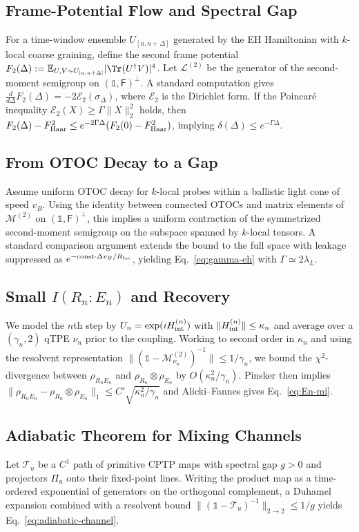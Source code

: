 \documentclass[aps,prd,preprint,onecolumn,superscriptaddress,nofootinbib,longbibliography,floatfix,11pt,showpacs,showkeys]{revtex4-2}
\theoremstyle{plain}
\theoremstyle{definition}
\theoremstyle{remark}
\begin{document}
\subsection{Frame-Potential Flow and Spectral Gap}
For a time-window ensemble $U_{[u,u+\Delta]}$ generated by the EH Hamiltonian with $k$-local coarse graining, define the second frame potential $F_2(\Delta) := \mathbb{E}_{U,V \sim U_{[u,u+\Delta]}} |\Tr(U^\dagger V)|^4$. Let $\mathcal{L}^{(2)}$ be the generator of the second-moment semigroup on $(\mathbb{1}, \mathsf{F})^\perp$. A standard computation gives $\frac{d}{d\Delta} F_2(\Delta) = -2 \mathcal{E}_2(\sigma_\Delta)$, where $\mathcal{E}_2$ is the Dirichlet form. If the Poincaré inequality $\mathcal{E}_2(X) \ge \Gamma \|X\|_2^2$ holds, then $F_2(\Delta) - F_{\rm Haar}^2 \le e^{-2\Gamma\Delta} (F_2(0) - F_{\rm Haar}^2)$, implying $\delta(\Delta) \le e^{-\Gamma\Delta}$.

\subsection{From OTOC Decay to a Gap}
Assume uniform OTOC decay for $k$-local probes within a ballistic light cone of speed $v_B$. Using the identity between connected OTOCs and matrix elements of $\mathcal{M}^{(2)}$ on $(\mathbb{1}, \mathsf{F})^\perp$, this implies a uniform contraction of the symmetrized second-moment semigroup on the subspace spanned by $k$-local tensors. A standard comparison argument extends the bound to the full space with leakage suppressed as $e^{-\text{const}\cdot \Delta v_B/R_{\rm loc}}$, yielding Eq.~\eqref{eq:gamma-eh} with $\Gamma \simeq 2\lambda_L$.

\subsection{Small \texorpdfstring{$I(R_n:E_n)$}{I(Rn:En)} and Recovery}
We model the $n$th step by $U_n = \exp(iH^{(n)}_{\rm int})$ with $\|H^{(n)}_{\rm int}\| \le \kappa_n$ and average over a $(\gamma_n, 2)$ qTPE $\nu_n$ prior to the coupling. Working to second order in $\kappa_n$ and using the resolvent representation $\|(\mathbb{1} - \mathcal{M}^{(2)}_{\nu_n})^{-1}\| \le 1/\gamma_n$, we bound the $\chi^2$-divergence between $\rho_{R_n E_n}$ and $\rho_{R_n} \otimes \rho_{E_n}$ by $O(\kappa_n^2/\gamma_n)$. Pinsker then implies $\|\rho_{R_n E_n} - \rho_{R_n} \otimes \rho_{E_n}\|_1 \le C'\sqrt{\kappa_n^2/\gamma_n}$ and Alicki--Fannes gives Eq.~\eqref{eq:En-mi}.

\subsection{Adiabatic Theorem for Mixing Channels}
Let $\mathcal{T}_u$ be a $C^1$ path of primitive CPTP maps with spectral gap $g > 0$ and projectors $\Pi_u$ onto their fixed-point lines. Writing the product map as a time-ordered exponential of generators on the orthogonal complement, a Duhamel expansion combined with a resolvent bound $\|(\mathbb{1} - \mathcal{T}_u)^{-1}\|_{2\to 2} \le 1/g$ yields Eq.~\eqref{eq:adiabatic-channel}.
\end{document}
